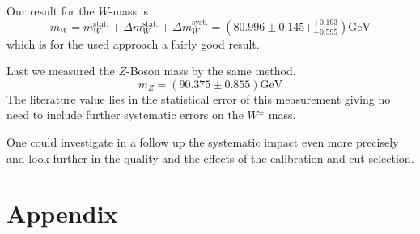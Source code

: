 \documentclass[11pt,a4paper,notitlepage]{scrartcl}
\begin{document}
Our result for the $W$-mass is
$$	m_W=m_W^\text{stat.}+\Delta m_W^\text{stat.}+\Delta m_W^\text{syst.}=\left(80.996\pm0.145+^{+0.193}_{-0.595}\right)\text{GeV}$$
which is for the used approach a fairly good result.

Last we measured the $Z$-Boson mass by the same method.
$$m_Z=(90.375\pm0.855)\text{GeV}$$
The literature value lies in the statistical error of this measurement giving no need to include further systematic errors on the $W^\pm$ mass. 

One could investigate in a follow up the systematic impact even more precisely and look further in the quality and the effects of the calibration and cut selection.    
\label{sec:conc}
\newpage
\appendix\section{Appendix}\label{sec:Appendix}
\end{document}
